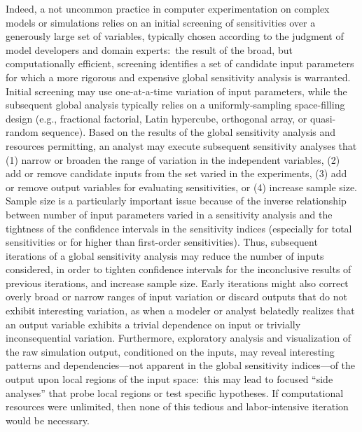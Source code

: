 \documentclass[12pt]{article}
\begin{document}
Indeed, a not uncommon practice in computer experimentation on complex models or simulations relies on an initial screening of sensitivities over a generously large set of variables, typically chosen according to the judgment of model developers and domain experts:\ the result of the broad, but computationally efficient, screening identifies a set of candidate input parameters for which a more rigorous and expensive global sensitivity analysis is warranted. Initial screening may use one-at-a-time variation of input parameters, while the subsequent global analysis typically relies on a uniformly-sampling space-filling design (e.g., fractional factorial, Latin hypercube, orthogonal array, or quasi-random sequence). Based on the results of the global sensitivity analysis and resources permitting, an analyst may execute subsequent sensitivity analyses that (1) narrow or broaden the range of variation in the independent variables, (2) add or remove candidate inputs from the set varied in the experiments, (3) add or remove output variables for evaluating sensitivities, or (4) increase sample size. Sample size is a particularly important issue because of the inverse relationship between number of input parameters varied in a sensitivity analysis and the tightness of the confidence intervals in the sensitivity indices (especially for total sensitivities or for higher than first-order sensitivities). Thus, subsequent iterations of a global sensitivity analysis may reduce the number of inputs considered, in order to tighten confidence intervals for the inconclusive results of previous iterations, and increase sample size. Early iterations might also correct overly broad or narrow ranges of input variation or discard outputs that do not exhibit interesting variation, as when a modeler or analyst belatedly realizes that an output variable exhibits a trivial dependence on input or trivially inconsequential variation. Furthermore, exploratory analysis and visualization of the raw simulation output, conditioned on the inputs, may reveal interesting patterns and dependencies---not apparent in the global sensitivity indices---of the output upon local regions of the input space:\ this may lead to focused ``side analyses'' that probe local regions or test specific hypotheses. If computational resources were unlimited, then none of this tedious and labor-intensive iteration would be necessary.
\end{document}
